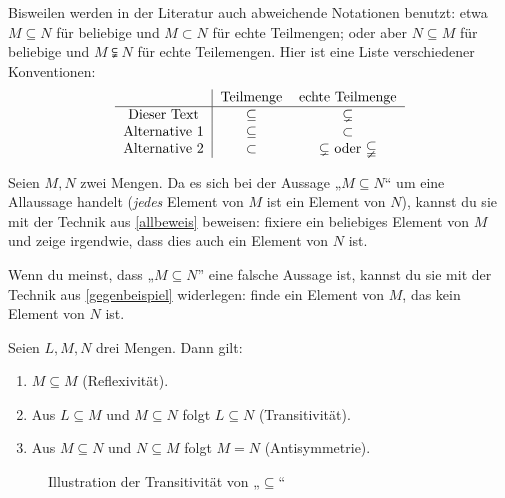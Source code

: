 \begin{nota}
    Bisweilen werden in der Literatur auch abweichende Notationen benutzt: etwa $M\subseteq N$ für beliebige und $M\subset N$ für echte Teilmengen; oder aber $N\subseteq M$ für beliebige und $M\subsetneqq N$ für echte Teilemengen. Hier ist eine Liste verschiedener Konventionen:
    \[\begin{tabular}{c|ccc}
        & Teilmenge & echte Teilmenge \\ \hline
        Dieser Text & $\subseteq$ & $\subsetneq$ \\
        Alternative 1 & $\subseteq$ & $\subset$ \\
        Alternative 2 & $\subset$ & $\subsetneq$ oder $\subsetneqq$
    \end{tabular}\]
\end{nota}


\begin{bem} \label{teilmengebeweisen}
    Seien $M,N$ zwei Mengen. Da es sich bei der Aussage „$M\subseteq N$“ um eine Allaussage handelt (\emph{jedes} Element von $M$ ist ein Element von $N$), kannst du sie mit der Technik aus \cref{allbeweis} beweisen: fixiere ein beliebiges Element von $M$ und zeige irgendwie, dass dies auch ein Element von $N$ ist.
    
    Wenn du meinst, dass „$M\subseteq N$” eine falsche Aussage ist, kannst du sie mit der Technik aus \cref{gegenbeispiel} widerlegen: finde ein Element von $M$, das kein Element von $N$ ist.
\end{bem}


\begin{satz}\label{teilmengeneig}
    Seien $L, M, N$ drei Mengen. Dann gilt:
    \begin{enumerate}
        \item $M\subseteq M$ (Reflexivität).
        \item Aus $L\subseteq M$ und $M\subseteq N$ folgt $L\subseteq N$ (Transitivität).
        \item Aus $M \subseteq N$ und $N\subseteq M$ folgt $M=N$ (Antisymmetrie).
    \end{enumerate}
    \begin{figure}[ht]
        \centering \caption{Illustration der Transitivität von „$\subseteq$“}
    \end{figure}
\end{satz}


